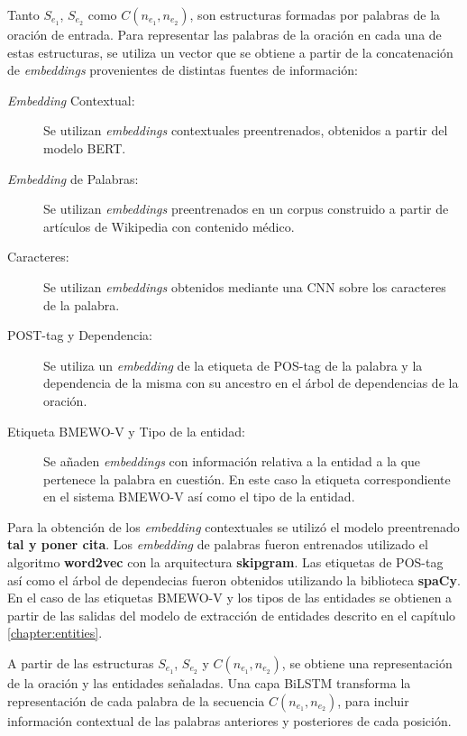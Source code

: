 Tanto $S_{e_1}$, $S_{e_2}$ como $C(n_{e_1}, n_{e_2})$, son estructuras formadas por palabras de la oración de entrada. Para representar las palabras de la oración en cada una de estas estructuras, se utiliza un vector que se obtiene a partir de la concatenación de \textit{embeddings} provenientes de distintas fuentes de información:

\begin{description}
	\item[\textit{Embedding} Contextual:] Se utilizan \textit{embeddings} contextuales preentrenados, obtenidos a partir del modelo BERT.
	
	\item[\textit{Embedding} de Palabras:] Se utilizan \textit{embeddings} preentrenados en un corpus construido a partir de artículos de Wikipedia con contenido médico.
	
	\item[Caracteres:] Se utilizan \textit{embeddings} obtenidos mediante una CNN sobre los caracteres de la palabra.
	
	\item[POST-tag y Dependencia:] Se utiliza un \textit{embedding} de la etiqueta de POS-tag de la palabra y la dependencia de la misma con su ancestro en el árbol de dependencias de la oración.
	
	\item[Etiqueta BMEWO-V y Tipo de la entidad:] Se añaden \textit{embeddings} con información relativa a la entidad a la que pertenece la palabra en cuestión.
	En este caso la etiqueta correspondiente en el sistema BMEWO-V así como el tipo de la entidad.
	
\end{description}

Para la obtención de los \textit{embedding} contextuales se utilizó el modelo preentrenado \textbf{tal y poner cita}.
Los \textit{embedding} de palabras fueron entrenados utilizado el algoritmo \textbf{word2vec}\cite{word2vec} con la arquitectura \textbf{skipgram}.
Las etiquetas de POS-tag así como el árbol de dependecias fueron obtenidos utilizando la biblioteca \textbf{spaCy}\cite{spacy2}.
En el caso de las etiquetas BMEWO-V y los tipos de las entidades se obtienen a partir de las salidas del modelo de extracción de entidades descrito en el capítulo \ref{chapter:entities}.

A partir de las estructuras $S_{e_1}$, $S_{e_2}$ y $C(n_{e_1}, n_{e_2})$, se obtiene una representación de la oración y las entidades señaladas.
Una capa BiLSTM transforma la representación de cada palabra de la secuencia $C(n_{e_1}, n_{e_2})$, para incluir información contextual de las palabras anteriores y posteriores de cada posición.

